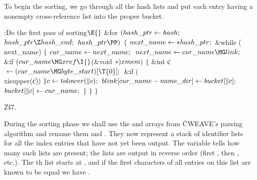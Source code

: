 To begin the sorting, we go through all the hash lists and put each
entry
having a nonempty cross-reference list into the proper bucket.

\Y\B\4:Do the first pass of sorting\X${}\E{}$\6
\&{for} ${}(\\{hash\_ptr}\leftarrow\\{hash};{}$ ${}\\{hash\_ptr}\Z\\{hash\_end};{}$ ${}%
\\{hash\_ptr}\PP){}$\5
${}\{{}$\1\6
${}\\{next\_name}\leftarrow{*}\\{hash\_ptr};{}$\6
\&{while} (\\{next\_name})\5
${}\{{}$\1\6
${}\\{cur\_name}\leftarrow\\{next\_name};{}$\6
${}\\{next\_name}\K\\{cur\_name}\MG\\{link};{}$\6
\&{if} ${}(\\{cur\_name}\MG\\{xref}\I{}$(\&{void} ${}{*})\,\\{xmem}){}$\5
${}\{{}$\1\6
\&{int} \|c${}\K(\\{cur\_name}\MG\\{byte\_start})[\T{0}];{}$\7
\&{if} (\\{xisupper}(\|c))\1\5
${}\|c\leftarrow\\{tolower}(\|c);{}$\2\6
${}\\{blink}[\\{cur\_name}-\\{name\_dir}]\leftarrow\\{bucket}[\|c];{}$\6
${}\\{bucket}[\|c]\leftarrow\\{cur\_name};{}$\6
\4${}\}{}$\2\6
\4${}\}{}$\2\6
\4${}\}{}$\2\par
\U247.\fi

During the sorting phase we shall use the  and  arrays from
\.{CWEAVE}'s parsing algorithm and rename them  and . They now
represent a stack of identifier lists for all the index entries that have
not yet been output. The variable  tells how many such lists
are
present; the lists are output in reverse order (first , then
, etc.). The th list starts at , and if the first
 characters of all entries on this list are known to be equal we have
.

